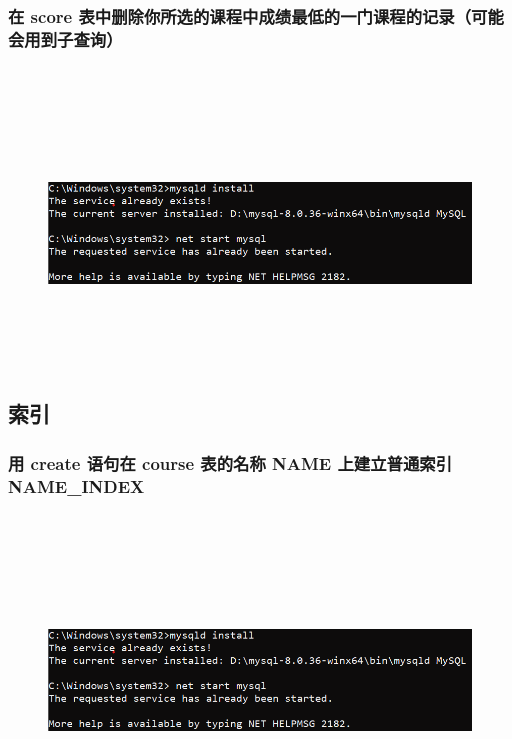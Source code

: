 \documentclass{ctexart}
\begin{document}
\subsubsection{在 score 表中删除你所选的课程中成绩最低的一门课程的记录（可能会用到子查询）}
\begin{lstlisting}[language=sql]
	
\end{lstlisting}
\begin{figure}[H]
	\centering 
	\includegraphics[height=7cm,width=14cm]{1.png}
	\end{figure}
\subsection{索引}
\subsubsection{用 create 语句在 course 表的名称 NAME 上建立普通索引 NAME\_INDEX}
\begin{lstlisting}[language=sql]
	
\end{lstlisting}
\begin{figure}[H]
	\centering 
	\includegraphics[height=7cm,width=14cm]{1.png}
	\end{figure}
\end{document}
